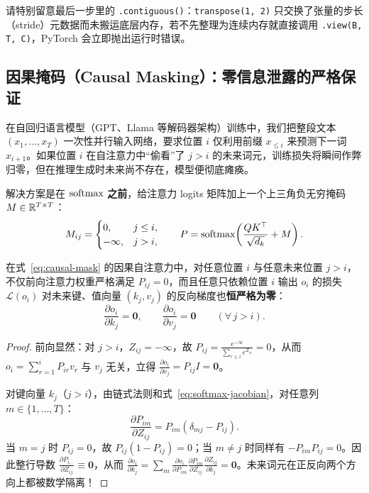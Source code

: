 请特别留意最后一步里的 \texttt{.contiguous()}：\texttt{transpose(1, 2)} 只交换了张量的步长（stride）元数据而未搬运底层内存，若不先整理为连续内存就直接调用 \texttt{.view(B, T, C)}，PyTorch 会立即抛出运行时错误。

\subsection{因果掩码（Causal Masking）：零信息泄露的严格保证}

在自回归语言模型（GPT、Llama 等解码器架构）训练中，我们把整段文本 $(x_1, \dots, x_T)$ 一次性并行输入网络，要求位置 $i$ 仅利用前缀 $x_{\le i}$ 来预测下一词 $x_{i+1}$。如果位置 $i$ 在自注意力中“偷看”了 $j > i$ 的未来词元，训练损失将瞬间作弊归零，但在推理生成时未来尚不存在，模型便彻底瘫痪。

解决方案是在 $\operatorname{softmax}$ \textbf{之前}，给注意力 logits 矩阵加上一个上三角负无穷掩码 $M \in \mathbb{R}^{T \times T}$：
\begin{equation}
  M_{ij} = \begin{cases}
    0, & j \le i,\\
    -\infty, & j > i,
  \end{cases}
  \qquad
  P = \operatorname{softmax}\!\left(\frac{Q K^\top}{\sqrt{d_k}} + M\right).
  \label{eq:causal-mask}
\end{equation}

\begin{thmBox}
\begin{proposition}[因果掩码的零未来梯度定理]
\label{prop:causal-zero-grad}
在式~\eqref{eq:causal-mask} 的因果自注意力中，对任意位置 $i$ 与任意未来位置 $j > i$，不仅前向注意力权重严格满足 $P_{ij} = 0$，而且任意只依赖位置 $i$ 输出 $o_i$ 的损失 $\mathcal{L}(o_i)$ 对未来键、值向量 $(k_j, v_j)$ 的反向梯度也\textbf{恒严格为零}：
\[
  \frac{\partial o_i}{\partial k_j} = \mathbf{0}, \qquad \frac{\partial o_i}{\partial v_j} = \mathbf{0} \qquad (\forall\, j > i).
\]
\end{proposition}
\begin{proof}
前向显然：对 $j > i$，$Z_{ij} = -\infty$，故 $P_{ij} = \frac{e^{-\infty}}{\sum_{r \le i} e^{Z_{ir}}} = 0$，从而 $o_i = \sum_{r=1}^i P_{ir} v_r$ 与 $v_j$ 无关，立得 $\frac{\partial o_i}{\partial v_j} = P_{ij} I = \mathbf{0}$。

对键向量 $k_j$（$j > i$），由链式法则和式~\eqref{eq:softmax-jacobian}，对任意列 $m \in \{1, \dots, T\}$：
\[
  \frac{\partial P_{im}}{\partial Z_{ij}} = P_{im}(\delta_{mj} - P_{ij}).
\]
当 $m = j$ 时 $P_{ij} = 0$，故 $P_{ij}(1 - P_{ij}) = 0$；当 $m \ne j$ 时同样有 $-P_{im} P_{ij} = 0$。因此整行导数 $\frac{\partial P_{i,:}}{\partial Z_{ij}} \equiv \mathbf{0}$，从而 $\frac{\partial o_i}{\partial k_j} = \sum_m \frac{\partial o_i}{\partial P_{im}}\frac{\partial P_{im}}{\partial Z_{ij}}\frac{\partial Z_{ij}}{\partial k_j} = \mathbf{0}$。未来词元在正反向两个方向上都被数学隔离！
\end{proof}
\end{thmBox}

